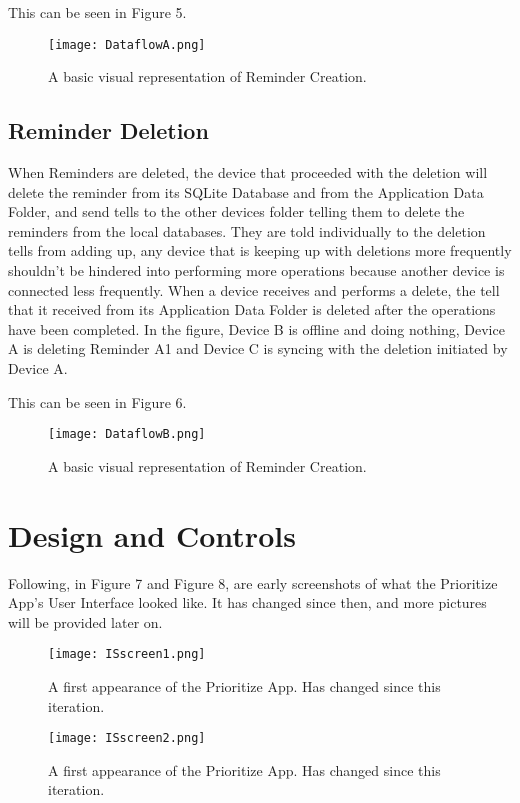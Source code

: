 \documentclass[12pt]{article}
\begin{document}
This can be seen in Figure 5.

\begin{figure}[h]
\texttt{[image: DataflowA.png]}
\centering
\caption{A basic visual representation of Reminder Creation.}
\end{figure}


\subsection{Reminder Deletion}
When Reminders are deleted, the device that proceeded with the deletion will delete the reminder from its SQLite Database and from the Application Data Folder, and send tells to the other devices folder telling them to delete the reminders from the local databases. They are told individually to the deletion tells from adding up, any device that is keeping up with deletions more frequently shouldn’t be hindered into performing more operations because another device is connected less frequently. When a device receives and performs a delete, the tell that it received from its Application Data Folder is deleted after the operations have been completed. In the figure, Device B is offline and doing nothing, Device A is deleting Reminder A1 and Device C is syncing with the deletion initiated by Device A.

This can be seen in Figure 6.

\begin{figure}[h]
\texttt{[image: DataflowB.png]}
\centering
\caption{A basic visual representation of Reminder Creation.}
\end{figure}


\section{Design and Controls}

Following, in Figure 7 and Figure 8, are early screenshots of what the Prioritize App's User Interface looked like. It has changed since then, and more pictures will be provided later on.

\begin{figure}[h]
\texttt{[image: ISscreen1.png]}
\centering
\caption{A first appearance of the Prioritize App. Has changed since this iteration.}
\end{figure}


\begin{figure}[h]
\texttt{[image: ISscreen2.png]}
\centering
\caption{A first appearance of the Prioritize App. Has changed since this iteration.}
\end{figure}
\end{document}
